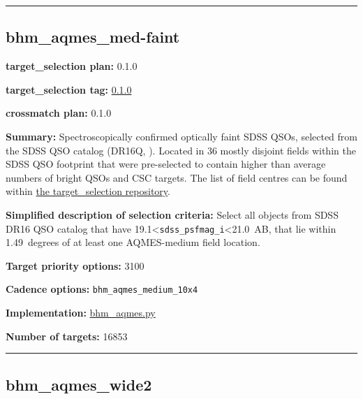 \begin{center}\rule{0.5\linewidth}{0.5pt}\end{center}

\hypertarget{bhm_aqmes_med-faint_plan0.1.0}{%
\subsection{bhm\_aqmes\_med-faint}\label{bhm_aqmes_med-faint_plan0.1.0}}

\noindent\textbf{target\_selection plan:} 0.1.0

\noindent\textbf{target\_selection tag:}
\href{https://github.com/sdss/target_selection/tree/0.1.0/}{0.1.0}

\noindent\textbf{crossmatch plan:} 0.1.0

\noindent\textbf{Summary:} Spectroscopically confirmed optically faint SDSS QSOs,
selected from the SDSS QSO catalog (DR16Q,
\citealt{Lyke2020}). Located in 36 mostly disjoint fields within the SDSS QSO
footprint that were pre-selected to contain higher than average numbers
of bright QSOs and CSC targets. The list of field centres can be found
within
\href{https://github.com/sdss/target_selection/blob/0.1.0/python/target_selection/masks/candidate_target_fields_bhm_aqmes_med_v0.2.1.fits}{the
target\_selection repository}.

\noindent\textbf{Simplified description of selection criteria:} Select all
objects from SDSS DR16 QSO catalog that have
19.1\textless{}\texttt{sdss\_psfmag\_i}\textless21.0~AB, that lie within
1.49~degrees of at least one AQMES-medium field location.


\noindent\textbf{Target priority options:} 3100

\noindent\textbf{Cadence options:} \texttt{bhm\_aqmes\_medium\_10x4}

\noindent\textbf{Implementation:}
\href{https://github.com/sdss/target_selection/blob/0.1.0/python/target_selection/cartons/bhm_aqmes.py}{bhm\_aqmes.py}

\noindent\textbf{Number of targets:} 16853

\begin{center}\rule{0.5\linewidth}{0.5pt}\end{center}

\hypertarget{bhm_aqmes_wide2_plan0.1.0}{%
\subsection{bhm\_aqmes\_wide2}\label{bhm_aqmes_wide2_plan0.1.0}}

